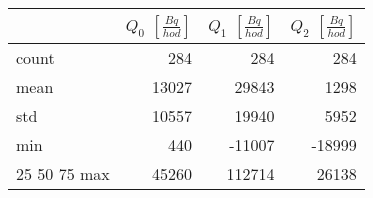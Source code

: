 \begin{tabular}{lrrr}
\toprule
{} &  $Q_0$ $\left[\si{\frac{Bq}{hod}}\right]$ &  $Q_1$ $\left[\si{\frac{Bq}{hod}}\right]$ &  $Q_2$ $\left[\si{\frac{Bq}{hod}}\right]$ \\
\midrule
count &                                       284 &                                       284 &                                       284 \\
mean  &                                     13027 &                                     29843 &                                      1298 \\
std   &                                     10557 &                                     19940 &                                      5952 \\
min   &                                       440 &                                    -11007 &                                    -18999 \\
25%
50%
75%
max   &                                     45260 &                                    112714 &                                     26138 \\
\bottomrule
\end{tabular}
